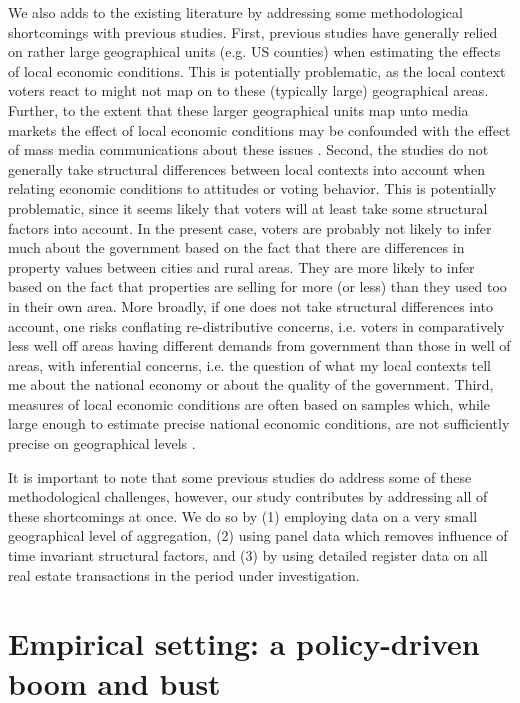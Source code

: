 \documentclass[12pt,a4paper]{article}
\begin{document}
We also adds to the existing literature by addressing some methodological shortcomings with previous studies. First, previous studies have generally relied on rather large geographical units (e.g. US counties) when estimating the effects of local economic conditions. This is potentially problematic, as the local context voters react to might not map on to these (typically large) geographical areas. Further, to the extent that these larger geographical units map unto media markets the effect of local economic conditions may be confounded with the effect of mass media communications about these issues \citep[][]{bisgaard2016reconsidering}. Second, the studies do not generally take structural differences between local contexts into account when relating economic conditions to  attitudes or voting behavior. This is potentially problematic, since it seems likely that voters will at least take some structural factors into account. In the present case, voters are probably not likely to infer much about the government based on the fact that there are differences in property values between cities and rural areas. They are more likely to infer based on the fact that properties are selling for more (or less) than they used too in their own area. More broadly, if one does not take structural differences into account, one risks conflating re-distributive concerns, i.e. voters in comparatively less well off areas having different demands from government than those in well of areas, with inferential concerns, i.e. the question of what my local contexts tell me about the national economy or about the quality of the government. Third,  measures of local economic conditions are often based on samples which, while large enough to estimate precise national economic conditions, are not sufficiently precise on geographical levels \citep[][]{healy2014presidential}. 

It is important to note that some previous studies do  address some of these methodological challenges, however, our study contributes by addressing all of these shortcomings at once. We do so by (1) employing data on a very small geographical level of aggregation, (2) using panel data which removes influence of time invariant structural factors, and (3) by using detailed register data on all real estate transactions in the period under investigation.


\section{Empirical setting: a policy-driven boom and bust}
\end{document}
